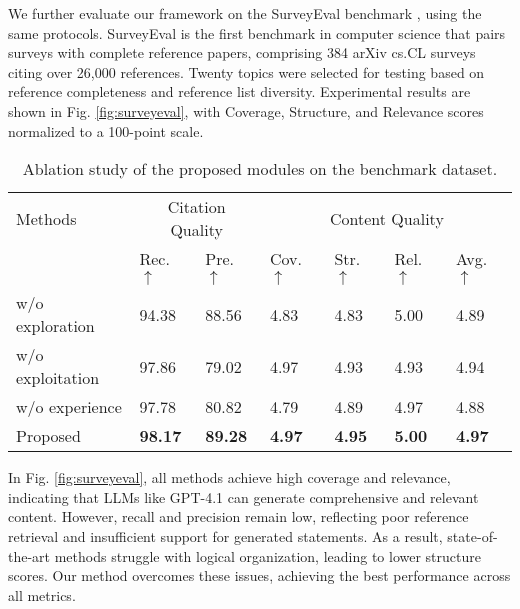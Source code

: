 \documentclass[manuscript,review,anonymous]{acmart}
\begin{document}
We further evaluate our framework on the SurveyEval benchmark \cite{wang2025llm}, using the same protocols. SurveyEval is the first benchmark in computer science that pairs surveys with complete reference papers, comprising 384 arXiv cs.CL surveys citing over 26,000 references. Twenty topics were selected for testing based on reference completeness and reference list diversity. Experimental results are shown in Fig. \ref{fig:surveyeval}, with Coverage, Structure, and Relevance scores normalized to a 100-point scale.

\begin{table}[h]
    \centering
    \begin{adjustbox}{width=\columnwidth}
        \begin{tabular}{lllllll}
            \toprule
            \multirow{2.5}{*}{Methods} & \multicolumn{2}{c}{Citation Quality} & \multicolumn{4}{c}{Content Quality} \\
            \cmidrule(lr){2-3} \cmidrule(lr){4-7}
            & Rec. $\uparrow$ & Pre. $\uparrow$ & Cov. $\uparrow$ & Str. $\uparrow$ & Rel. $\uparrow$ & Avg. $\uparrow$ \\
            \midrule
            w/o exploration  & 94.38 & 88.56 & 4.83 & 4.83 & 5.00 & 4.89 \\
            w/o exploitation & 97.86 & 79.02 & 4.97 & 4.93 & 4.93 & 4.94 \\
            w/o experience        & 97.78 & 80.82 & 4.79 & 4.89 & 4.97 & 4.88 \\
            \cellcolor{gray!15}Proposed & \cellcolor{gray!15}\textbf{98.17} & \cellcolor{gray!15}\textbf{89.28} & \cellcolor{gray!15}\textbf{4.97} & \cellcolor{gray!15}\textbf{4.95} & \cellcolor{gray!15}\textbf{5.00} & \cellcolor{gray!15}\textbf{4.97} \\
            \bottomrule
        \end{tabular}
    \end{adjustbox}
    \caption{Ablation study of the proposed modules on the benchmark dataset.}
    \label{tab:ablation_study}
\end{table}

In Fig. \ref{fig:surveyeval}, all methods achieve high coverage and relevance, indicating that LLMs like GPT-4.1 can generate comprehensive and relevant content. However, recall and precision remain low, reflecting poor reference retrieval and insufficient support for generated statements. As a result, state-of-the-art methods struggle with logical organization, leading to lower structure scores. Our method overcomes these issues, achieving the best performance across all metrics.
\end{document}
